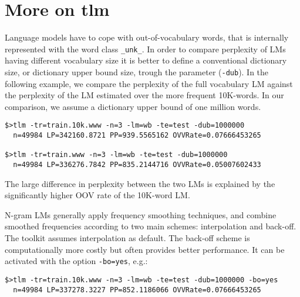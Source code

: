 \documentclass[11pt]{article}
\begin{document}
\newpage
\section{More on tlm}
Language models have to  cope with out-of-vocabulary words, that is internally represented
with the word class  {\tt \_unk\_}.  In order  to
compare perplexity of LMs having  different vocabulary size it is better
to define  a conventional dictionary  size, or dictionary  upper bound
size,  trough the  parameter  ({\tt -dub}).  In  the  following example,  we
compare the perplexity of the full vocabulary LM against the perplexity of the
LM estimated over the more frequent 10K-words. In our comparison, we assume a dictionary 
upper bound of one million words.

\begin{verbatim}
$>tlm -tr=train.10k.www -n=3 -lm=wb -te=test -dub=1000000
  n=49984 LP=342160.8721 PP=939.5565162 OVVRate=0.07666453265

$>tlm -tr=train.www -n=3 -lm=wb -te=test -dub=1000000
  n=49984 LP=336276.7842 PP=835.2144716 OVVRate=0.05007602433
\end{verbatim}


\noindent
The  large  difference  in  perplexity  between the two LMs is   explained  by  the 
significantly higher  OOV rate of the 10K-word LM.

\noindent
N-gram LMs generally apply frequency smoothing techniques, and combine
smoothed frequencies according to  two main schemes: interpolation and
back-off.  The  toolkit assumes interpolation
as default.  The back-off  scheme is computationally more costly but
often provides better performance. It  can be activated with the option
{\tt -bo=yes}, e.g.:

\begin{verbatim}
$>tlm -tr=train.10k.www -n=3 -lm=wb -te=test -dub=1000000 -bo=yes
  n=49984 LP=337278.3227 PP=852.1186066 OVVRate=0.07666453265
\end{verbatim}
\end{document}
